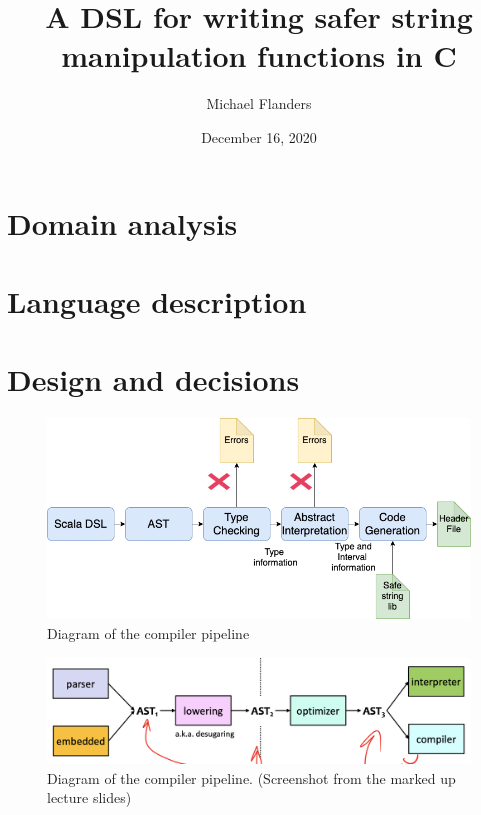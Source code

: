 \documentclass[letterpaper]{article}
\title{A DSL for writing safer string manipulation functions in C}
\author{Michael Flanders}
\date{December 16, 2020}
\begin{document}
\maketitle


\section{Domain analysis}


\section{Language description}


\section{Design and decisions}

\begin{figure}[h]
  \centering
  \includegraphics[width=\textwidth]{architecture.png}
  \caption{Diagram of the compiler pipeline}
  \label{fig:pipeline}
\end{figure}

\begin{figure}[h]
  \centering
  \includegraphics[width=\textwidth]{modern-compiler-pipeline.png}
  \caption{Diagram of the compiler pipeline. (Screenshot from the marked up lecture slides)}
  \label{fig:mdnpipeline}
\end{figure}
\end{document}
